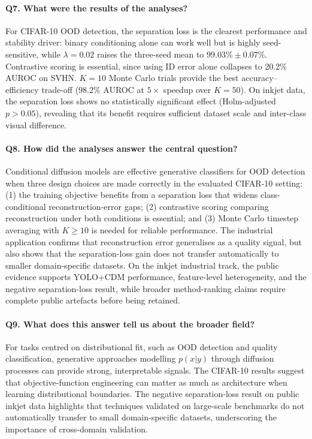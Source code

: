 \paragraph{Q7. What were the results of the analyses?}
For CIFAR-10 OOD detection, the separation loss is the clearest performance and stability driver: binary conditioning alone can work well but is highly seed-sensitive, while $\lambda{=}0.02$ raises the three-seed mean to $99.03\% \pm 0.07\%$. Contrastive scoring is essential, since using ID error alone collapses to 20.2\% AUROC on SVHN. $K{=}10$ Monte Carlo trials provide the best accuracy--efficiency trade-off (98.2\% AUROC at $5\times$ speedup over $K{=}50$). On inkjet data, the separation loss shows no statistically significant effect (Holm-adjusted $p > 0.05$), revealing that its benefit requires sufficient dataset scale and inter-class visual difference.

\paragraph{Q8. How did the analyses answer the central question?}
Conditional diffusion models are effective generative classifiers for OOD detection when three design choices are made correctly in the evaluated CIFAR-10 setting: (1) the training objective benefits from a separation loss that widens class-conditional reconstruction-error gaps; (2) contrastive scoring comparing reconstruction under both conditions is essential; and (3) Monte Carlo timestep averaging with $K \geq 10$ is needed for reliable performance. The industrial application confirms that reconstruction error generalises as a quality signal, but also shows that the separation-loss gain does not transfer automatically to smaller domain-specific datasets. On the inkjet industrial track, the public evidence supports YOLO+CDM performance, feature-level heterogeneity, and the negative separation-loss result, while broader method-ranking claims require complete public artefacts before being retained.

\paragraph{Q9. What does this answer tell us about the broader field?}
For tasks centred on distributional fit, such as OOD detection and quality classification, generative approaches modelling $p(x|y)$ through diffusion processes can provide strong, interpretable signals. The CIFAR-10 results suggest that objective-function engineering can matter as much as architecture when learning distributional boundaries. The negative separation-loss result on public inkjet data highlights that techniques validated on large-scale benchmarks do not automatically transfer to small domain-specific datasets, underscoring the importance of cross-domain validation.
